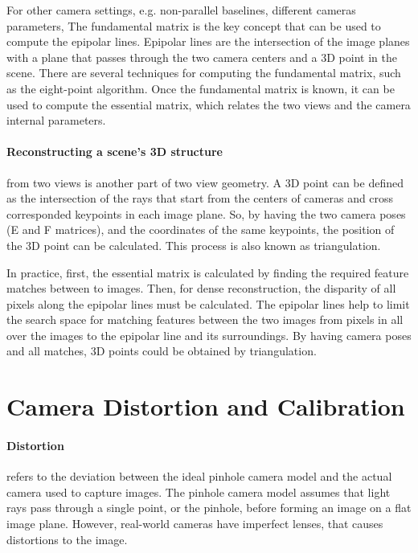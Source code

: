\documentclass[11pt]{article}
\begin{document}
    For other camera settings, e.g. non-parallel baselines, different cameras parameters, The fundamental matrix
    is the key concept that can be used to compute the epipolar lines. Epipolar lines are the intersection of
    the image planes with a plane that passes through the two camera centers and a 3D point in the scene.
    There are several techniques for computing the fundamental matrix, such as the eight-point algorithm.
    Once the fundamental matrix is known, it can be used to compute the essential matrix, which relates the
    two views and the camera internal parameters.

    \paragraph{Reconstructing a scene's 3D structure} from two views is another part of two view geometry.
    A 3D point can be defined as the intersection of the rays that start from the centers of cameras and
    cross corresponded keypoints in each image plane. So, by having the two camera poses (E and F matrices),
    and the coordinates of the same keypoints, the position of the 3D point can be calculated. This process
    is also known as triangulation.

    In practice, first, the essential matrix is calculated by finding the required feature matches between
    to images. Then, for dense reconstruction, the disparity of all pixels along the epipolar lines must be
    calculated. The epipolar lines help to limit the search space for matching features between the two images
    from pixels in all over the images to the epipolar line and its surroundings. By having camera poses and all
    matches, 3D points could be obtained by triangulation.

    \section{Camera Distortion and Calibration}

    \paragraph{Distortion} refers to the deviation between the ideal pinhole camera model and the actual camera
    used to capture images. The pinhole camera model assumes that light rays pass through a single point, or
    the pinhole, before forming an image on a flat image plane. However, real-world cameras have imperfect
    lenses, that causes distortions to the image.
\end{document}
